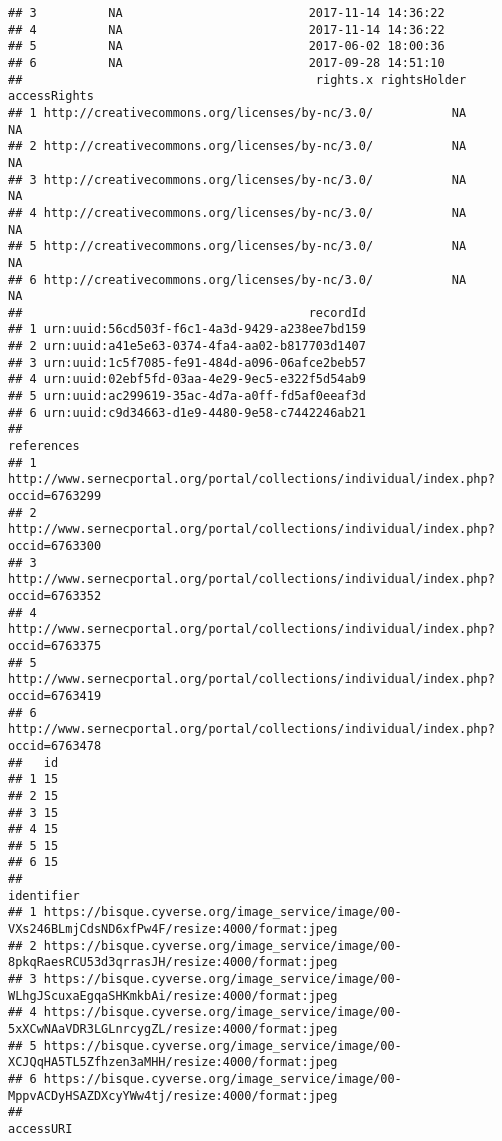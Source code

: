 \documentclass[
]{article}
\begin{document}
\begin{verbatim}
## 3          NA                          2017-11-14 14:36:22
## 4          NA                          2017-11-14 14:36:22
## 5          NA                          2017-06-02 18:00:36
## 6          NA                          2017-09-28 14:51:10
##                                         rights.x rightsHolder accessRights
## 1 http://creativecommons.org/licenses/by-nc/3.0/           NA           NA
## 2 http://creativecommons.org/licenses/by-nc/3.0/           NA           NA
## 3 http://creativecommons.org/licenses/by-nc/3.0/           NA           NA
## 4 http://creativecommons.org/licenses/by-nc/3.0/           NA           NA
## 5 http://creativecommons.org/licenses/by-nc/3.0/           NA           NA
## 6 http://creativecommons.org/licenses/by-nc/3.0/           NA           NA
##                                        recordId
## 1 urn:uuid:56cd503f-f6c1-4a3d-9429-a238ee7bd159
## 2 urn:uuid:a41e5e63-0374-4fa4-aa02-b817703d1407
## 3 urn:uuid:1c5f7085-fe91-484d-a096-06afce2beb57
## 4 urn:uuid:02ebf5fd-03aa-4e29-9ec5-e322f5d54ab9
## 5 urn:uuid:ac299619-35ac-4d7a-a0ff-fd5af0eeaf3d
## 6 urn:uuid:c9d34663-d1e9-4480-9e58-c7442246ab21
##                                                                          references
## 1 http://www.sernecportal.org/portal/collections/individual/index.php?occid=6763299
## 2 http://www.sernecportal.org/portal/collections/individual/index.php?occid=6763300
## 3 http://www.sernecportal.org/portal/collections/individual/index.php?occid=6763352
## 4 http://www.sernecportal.org/portal/collections/individual/index.php?occid=6763375
## 5 http://www.sernecportal.org/portal/collections/individual/index.php?occid=6763419
## 6 http://www.sernecportal.org/portal/collections/individual/index.php?occid=6763478
##   id
## 1 15
## 2 15
## 3 15
## 4 15
## 5 15
## 6 15
##                                                                                         identifier
## 1 https://bisque.cyverse.org/image_service/image/00-VXs246BLmjCdsND6xfPw4F/resize:4000/format:jpeg
## 2 https://bisque.cyverse.org/image_service/image/00-8pkqRaesRCU53d3qrrasJH/resize:4000/format:jpeg
## 3 https://bisque.cyverse.org/image_service/image/00-WLhgJScuxaEgqaSHKmkbAi/resize:4000/format:jpeg
## 4 https://bisque.cyverse.org/image_service/image/00-5xXCwNAaVDR3LGLnrcygZL/resize:4000/format:jpeg
## 5 https://bisque.cyverse.org/image_service/image/00-XCJQqHA5TL5Zfhzen3aMHH/resize:4000/format:jpeg
## 6 https://bisque.cyverse.org/image_service/image/00-MppvACDyHSAZDXcyYWw4tj/resize:4000/format:jpeg
##                                                                                          accessURI

\end{verbatim}
\end{document}
